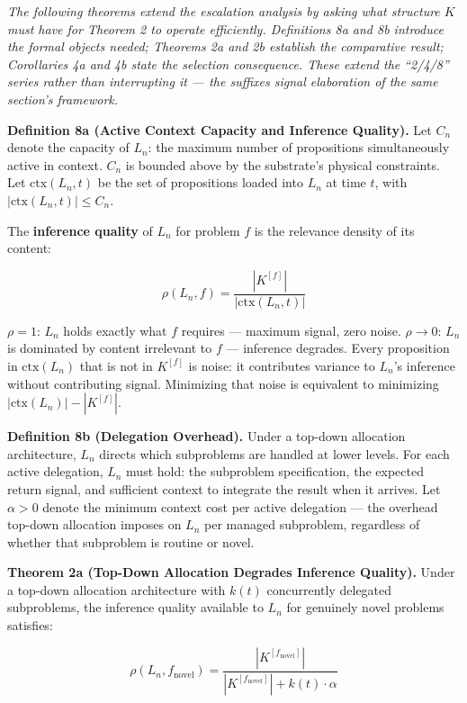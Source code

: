 \documentclass[
]{article}
\begin{document}
\emph{The following theorems extend the escalation analysis by asking
what structure \(K\) must have for Theorem 2 to operate efficiently.
Definitions 8a and 8b introduce the formal objects needed; Theorems 2a
and 2b establish the comparative result; Corollaries 4a and 4b state the
selection consequence. These extend the ``2/4/8'' series rather than
interrupting it --- the suffixes signal elaboration of the same
section's framework.}

\textbf{Definition 8a (Active Context Capacity and Inference Quality).}
Let \(C_n\) denote the capacity of \(L_n\): the maximum number of
propositions simultaneously active in context. \(C_n\) is bounded above
by the substrate's physical constraints. Let \(\text{ctx}(L_n, t)\) be
the set of propositions loaded into \(L_n\) at time \(t\), with
\(|\text{ctx}(L_n, t)| \leq C_n\).

The \textbf{inference quality} of \(L_n\) for problem \(f\) is the
relevance density of its content:

\[\rho(L_n, f) = \frac{|K^{[f]}|}{|\text{ctx}(L_n, t)|}\]

\(\rho = 1\): \(L_n\) holds exactly what \(f\) requires --- maximum
signal, zero noise. \(\rho \to 0\): \(L_n\) is dominated by content
irrelevant to \(f\) --- inference degrades. Every proposition in
\(\text{ctx}(L_n)\) that is not in \(K^{[f]}\) is noise: it contributes
variance to \(L_n\)'s inference without contributing signal. Minimizing
that noise is equivalent to minimizing
\(|\text{ctx}(L_n)| - |K^{[f]}|\).

\textbf{Definition 8b (Delegation Overhead).} Under a top-down
allocation architecture, \(L_n\) directs which subproblems are handled
at lower levels. For each active delegation, \(L_n\) must hold: the
subproblem specification, the expected return signal, and sufficient
context to integrate the result when it arrives. Let \(\alpha > 0\)
denote the minimum context cost per active delegation --- the overhead
top-down allocation imposes on \(L_n\) per managed subproblem,
regardless of whether that subproblem is routine or novel.

\textbf{Theorem 2a (Top-Down Allocation Degrades Inference Quality).}
Under a top-down allocation architecture with \(k(t)\) concurrently
delegated subproblems, the inference quality available to \(L_n\) for
genuinely novel problems satisfies:

\[\rho(L_n, f_{\text{novel}}) = \frac{|K^{[f_{\text{novel}}]}|}{|K^{[f_{\text{novel}}]}| + k(t)\cdot\alpha}\]
\end{document}

